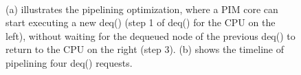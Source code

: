 \begin{figure}[ht!]
\centering
{}
\\

\caption{(a) illustrates the pipelining optimization, where a PIM core can start executing 
a new deq() (step 1 of deq() for the CPU on the left), without waiting for the dequeued node of 
the previous deq() to return to the CPU on the right (step 3). 
(b) shows the timeline of pipelining four deq() requests.}
\label{figure:queue_pipeline}
\end{figure}

